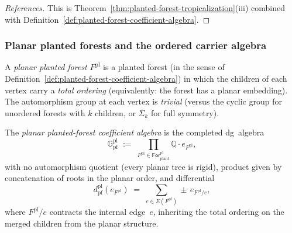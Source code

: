 \begin{proof}[References]
This is Theorem~\ref{thm:planted-forest-tropicalization}(iii)
combined with Definition~\ref{def:planted-forest-coefficient-algebra}.
\end{proof}

\subsubsection{Planar planted forests and the ordered carrier algebra}
\label{subsubsec:planar-planted-forests}

\begin{definition}
\label{def:planar-planted-forest-coefficient-algebra}
\ClaimStatusProvedHere
{}
A \emph{planar planted forest} $F^{\mathrm{pl}}$ is a planted forest
(in the sense of
Definition~\ref{def:planted-forest-coefficient-algebra}) in which
the children of each vertex carry a \emph{total ordering}
(equivalently: the forest has a planar embedding).  The automorphism
group at each vertex is \emph{trivial} (versus the cyclic group for
unordered forests with $k$ children, or $\Sigma_k$ for full
symmetry).

The \emph{planar planted-forest coefficient algebra} is the
completed dg~algebra
\begin{equation}
\label{eq:planar-planted-forest-coefficient-algebra}
\mathbb{G}_{\mathrm{pf}}^{\mathrm{pl}}
\;:=\;
\prod_{F^{\mathrm{pl}} \in
\mathsf{For}_{\mathrm{plant}}^{\mathrm{pl}}}
\mathbb{Q}\cdot e_{F^{\mathrm{pl}}},
\end{equation}
with no automorphism quotient (every planar tree is rigid), product
given by concatenation of roots in the planar order, and differential
\begin{equation}
\label{eq:planar-pf-differential}
d_{\mathrm{pf}}^{\mathrm{pl}}(e_{F^{\mathrm{pl}}})
\;=\;
\sum_{e \in E(F^{\mathrm{pl}})} \pm\, e_{F^{\mathrm{pl}}/e},
\end{equation}
where $F^{\mathrm{pl}}/e$ contracts the internal edge~$e$,
inheriting the total ordering on the merged children from the planar
structure.
\end{definition}

